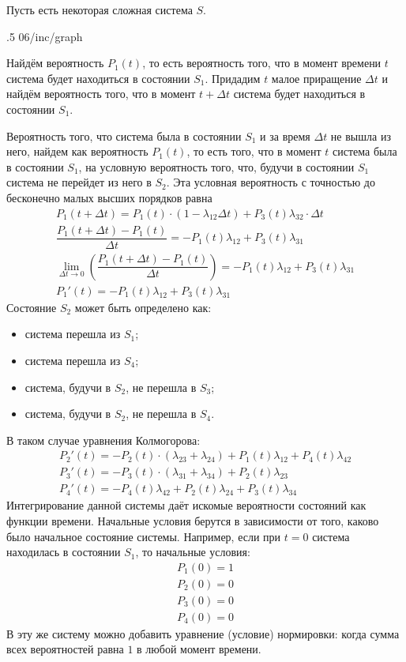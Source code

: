 Пусть есть некоторая сложная система $S$.

\image
{.5\textwidth}
{06/inc/graph}
{}

Найдём вероятность $P_1(t)$, то есть вероятность того, что в момент времени $t$ система будет находиться в состоянии $S_1$. Придадим $t$ малое приращение ${\Delta t}$ и найдём вероятность того, что в момент ${t + \Delta t}$ система будет находиться в состоянии $S_1$.

Вероятность того, что система была в состоянии $S_1$ и за время $\Delta t$ не вышла из него, найдем как вероятность $P_1(t)$, то есть того, что в момент $t$ система была в состоянии $S_1$, на условную вероятность того, что, будучи в состоянии $S_1$ система не перейдет из него в $S_2$. Эта условная вероятность с точностью до бесконечно малых высших порядков равна
%
\begin{gather*}
    P_1(t + \Delta t) = P_1(t)\cdot(1-\lambda_{12}\Delta t) + P_3(t)\lambda_{32}\cdot\Delta t\\
    \dfrac{P_1(t + \Delta t) - P_1(t)}{\Delta t} = -P_1(t)\lambda_{12} + P_3(t)\lambda_{31}\\
    \lim_{\Delta t\rightarrow 0}\left(\dfrac{P_1(t + \Delta t) - P_1(t)}{\Delta t}\right) = -P_1(t)\lambda_{12} + P_3(t)\lambda_{31}\\
    P_1'(t) = -P_1(t)\lambda_{12} + P_3(t)\lambda_{31}
\end{gather*}
%
Состояние $S_2$ может быть определено как:

\begin{itemize}
    \item система перешла из $S_1$;
    \item система перешла из $S_4$;
    \item система, будучи в $S_2$, не перешла в $S_3$;
    \item система, будучи в $S_2$, не перешла в $S_4$.
\end{itemize}

В таком случае уравнения Колмогорова:
%
\begin{gather*}
    P_2'(t) = -P_2(t)\cdot(\lambda_{23} + \lambda_{24}) + P_1(t)\lambda_{12} + P_4(t)\lambda_{42}\\
    P_3'(t) = -P_3(t)\cdot(\lambda_{31} + \lambda_{34}) + P_2(t)\lambda_{23}\\
    P_4'(t) = -P_4(t)\lambda_{42} + P_2(t)\lambda_{24} + P_3(t)\lambda_{34}
\end{gather*}
%
Интегрирование данной системы даёт искомые вероятности состояний как функции времени. Начальные условия берутся в зависимости от того, каково было начальное состояние системы. Например, если при ${t = 0}$ система находилась в состоянии $S_1$, то начальные условия:
%
\begin{gather*}
    P_1(0) = 1\\
    P_2(0) = 0\\
    P_3(0) = 0\\
    P_4(0) = 0
\end{gather*}
%
В эту же систему можно добавить уравнение (условие) нормировки: когда сумма всех вероятностей равна $1$ в любой момент времени.

